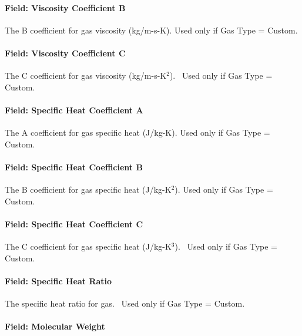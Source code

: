 \paragraph{Field: Viscosity Coefficient B}\label{field-viscosity-coefficient-b}

The B coefficient for gas viscosity (kg/m-s-K). Used only if Gas Type = Custom.

\paragraph{Field: Viscosity Coefficient C}\label{field-viscosity-coefficient-c}

The C coefficient for gas viscosity (kg/m-s-K\(^{2}\)).~ Used only if Gas Type = Custom.

\paragraph{Field: Specific Heat Coefficient A}\label{field-specific-heat-coefficient-a}

The A coefficient for gas specific heat (J/kg-K). Used only if Gas Type = Custom.

\paragraph{Field: Specific Heat Coefficient B}\label{field-specific-heat-coefficient-b}

The B coefficient for gas specific heat (J/kg-K\(^{2}\)). Used only if Gas Type = Custom.

\paragraph{Field: Specific Heat Coefficient C}\label{field-specific-heat-coefficient-c}

The C coefficient for gas specific heat (J/kg-K\(^{3}\)).~ Used only if Gas Type = Custom.

\paragraph{Field: Specific Heat Ratio}\label{field-specific-heat-ratio}

The specific heat ratio for gas.~ Used only if Gas Type = Custom.

\paragraph{Field: Molecular Weight}\label{field-molecular-weight}

